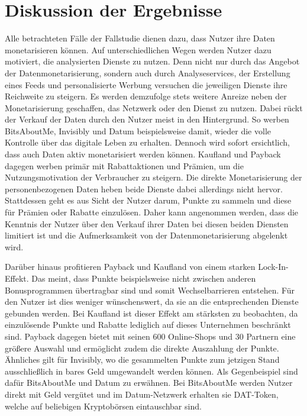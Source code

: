 \section{Diskussion der Ergebnisse}
Alle betrachteten Fälle der Fallstudie dienen dazu, dass Nutzer ihre Daten monetarisieren können. Auf unterschiedlichen Wegen werden Nutzer dazu motiviert, die analysierten Dienste zu nutzen. Denn nicht nur durch das Angebot der Datenmonetarisierung, sondern auch durch Analyseservices, der Erstellung eines Feeds und personalisierte Werbung versuchen die jeweiligen Dienste ihre Reichweite zu steigern. Es werden demzufolge stets weitere Anreize neben der Monetarisierung geschaffen, das Netzwerk oder den Dienst zu nutzen. Dabei rückt der Verkauf der Daten durch den Nutzer meist in den Hintergrund. So werben BitsAboutMe, Invisibly und Datum beispielsweise damit, wieder die volle Kontrolle über das digitale Leben zu erhalten. Dennoch wird sofort ersichtlich, dass auch Daten aktiv monetarisiert werden können. Kaufland und Payback dagegen werben primär mit Rabattaktionen und Prämien, um die Nutzungsmotivation der Verbraucher zu steigern. Die direkte Monetarisierung der personenbezogenen Daten heben beide Dienste dabei allerdings nicht hervor. Stattdessen geht es aus Sicht der Nutzer darum, Punkte zu sammeln und diese für Prämien oder Rabatte einzulösen. Daher kann angenommen werden, dass die Kenntnis der Nutzer über den Verkauf ihrer Daten bei diesen beiden Diensten limitiert ist und die Aufmerksamkeit von der Datenmonetarisierung abgelenkt wird. \newline

\noindent Darüber hinaus profitieren Payback und Kaufland von einem starken Lock-In-Effekt. Das meint, dass Punkte beispielsweise nicht zwischen anderen Bonusprogrammen übertragbar sind und somit Wechselbarrieren entstehen. Für den Nutzer ist dies weniger wünschenswert, da sie an die entsprechenden Dienste gebunden werden. Bei Kaufland ist dieser Effekt am stärksten zu beobachten, da einzulösende Punkte und Rabatte lediglich auf dieses Unternehmen beschränkt sind. Payback dagegen bietet mit seinen 600 Online-Shops und 30 Partnern eine größere Auswahl und ermöglicht zudem die direkte Auszahlung der Punkte. Ähnliches gilt für Invisibly, wo die gesammelten Punkte zum jetzigen Stand ausschließlich in bares Geld umgewandelt werden können. Als Gegenbeispiel sind dafür BitsAboutMe und Datum zu erwähnen. Bei BitsAboutMe werden Nutzer direkt mit Geld vergütet und im Datum-Netzwerk erhalten sie DAT-Token, welche auf beliebigen Kryptobörsen eintauschbar sind. \newline 

